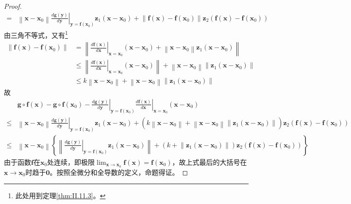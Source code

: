 \documentclass[main.tex]{subfiles}
\begin{document}
\begin{proof}
\begin{align*}
=&\left\|\mathbf{x}-\mathbf{x}_0\right\|\left.\frac{d\mathbf{g}\left(\mathbf{y}\right)}{d\mathbf{y}}\right|_{\mathbf{y}=\mathbf{f}\left(\mathbf{x}_0\right)}\mathbf{z}_1\left(\mathbf{x}-\mathbf{x}_0\right)+\left\|\mathbf{f}\left(\mathbf{x}\right)-\mathbf{f}\left(\mathbf{x}_0\right)\right\|\mathbf{z}_2\left(\mathbf{f}\left(\mathbf{x}\right)-\mathbf{f}\left(\mathbf{x}_0\right)\right)
\end{align*}
由三角不等式，又有\footnote{
此处用到定理\ref{thm:II.11.3}。
}
\begin{align*}
    \left\|\mathbf{f}\left(\mathbf{x}\right)-\mathbf{f}\left(\mathbf{x}_0\right)\right\|&=\left\|\left.\frac{d\mathbf{f}\left(\mathbf{x}\right)}{d\mathbf{x}}\right|_{\mathbf{x}=\mathbf{x}_0}\left(\mathbf{x}-\mathbf{x}_0\right)+\left\|\mathbf{x}-\mathbf{x}_0\right\|\mathbf{z}_1\left(\mathbf{x}-\mathbf{x}_0\right)\right\|\\
    &\leq \left\|\left.\frac{d\mathbf{f}\left(\mathbf{x}\right)}{d\mathbf{x}}\right|_{\mathbf{x}=\mathbf{x}_0}\left(\mathbf{x}-\mathbf{x}_0\right)\right\|+\left\|\mathbf{x}-\mathbf{x}_0\right\|\left\|\mathbf{z}_1\left(\mathbf{x}-\mathbf{x}_0\right)\right\|\\
    &\leq k\left\|\mathbf{x}-\mathbf{x}_0\right\|+\left\|\mathbf{x}-\mathbf{x}_0\right\|\left\|\mathbf{z}_1\left(\mathbf{x}-\mathbf{x}_0\right)\right\|
\end{align*}
故
\begin{align*}
    &\mathbf{g}\circ\mathbf{f}\left(\mathbf{x}\right)-\mathbf{g}\circ\mathbf{f}\left(\mathbf{x}_0\right)-\left.\frac{d\mathbf{g}\left(\mathbf{y}\right)}{d\mathbf{y}}\right|_{\mathbf{y}=\mathbf{f}\left(\mathbf{x}_0\right)}\left.\frac{d\mathbf{f}\left(\mathbf{x}\right)}{d\mathbf{x}}\right|_{\mathbf{x}=\mathbf{x}_0}\left(\mathbf{x}-\mathbf{x}_0\right)\\
    \leq&\left\|\mathbf{x}-\mathbf{x}_0\right\|\left.\frac{d\mathbf{g}\left(\mathbf{y}\right)}{d\mathbf{y}}\right|_{\mathbf{y}=\mathbf{f}\left(\mathbf{x}_0\right)}\mathbf{z}_1\left(\mathbf{x}-\mathbf{x}_0\right)+\left(k\left\|\mathbf{x}-\mathbf{x}_0\right\|+\left\|\mathbf{x}-\mathbf{x}_0\right\|\left\|\mathbf{z}_1\left(\mathbf{x}-\mathbf{x}_0\right)\right\|\right)\mathbf{z}_2\left(\mathbf{f}\left(\mathbf{x}\right)-\mathbf{f}\left(\mathbf{x}_0\right)\right)\\
    \leq&\left\|\mathbf{x}-\mathbf{x}_0\right\|\left\{\left\|\left.\frac{d\mathbf{g}\left(\mathbf{y}\right)}{d\mathbf{y}}\right|_{\mathbf{y}=\mathbf{f}\left(\mathbf{x}_0\right)}\mathbf{z}_1\left(\mathbf{x}-\mathbf{x}_0\right)\right\|+\left(k+\left\|\mathbf{z}_1\left(\mathbf{x}-\mathbf{x}_0\right)\right\|\right)\mathbf{z}_2\left(\mathbf{f}\left(\mathbf{x}\right)-\mathbf{f}\left(\mathbf{x}_0\right)\right)\right\}
\end{align*}
由于函数$\mathbf{f}$在$\mathbf{x}_0$处连续，即极限$\lim_{\mathbf{x}\to\mathbf{x}_0}\mathbf{f}\left(\mathbf{x}\right)=\mathbf{f}\left(\mathbf{x}_0\right)$，故上式最后的大括号在$\mathbf{x}\to\mathbf{x}_0$时趋于$\mathbf{0}$。按照全微分和全导数的定义，命题得证。
\end{proof}
\end{document}
